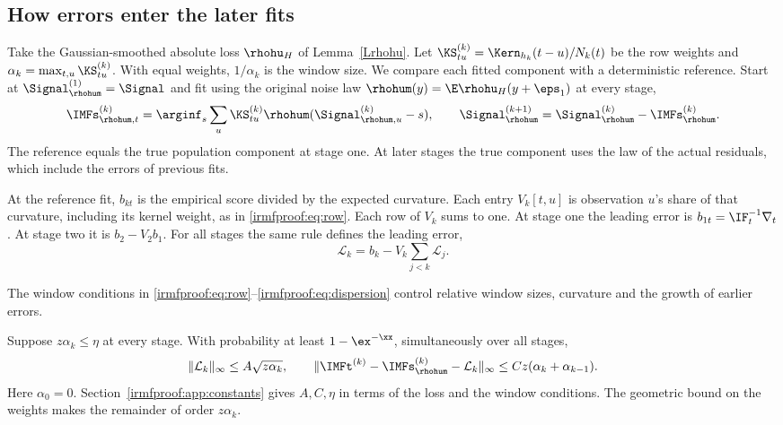 \subsection{How errors enter the later fits}\label{irmfproof:sec:recursive}

Take the Gaussian-smoothed absolute loss \(\rhohu_H\) of Lemma~\ref{Lrhohu}.
Let \(\KS_{tu}^{(k)}=\Kern_{h_k}(t-u)/N_k(t)\) be the row weights and
\(\alpha_k=\max_{t,u}\KS_{tu}^{(k)}\). With equal weights,
\(1/\alpha_k\) is the window size. We compare each fitted component with
a deterministic reference. Start at \(\Signal_{\rhohum}^{(1)}=\Signal\)
and fit using the original noise law \(\rhohum(y)=\E\rhohu_H(y+\eps_1)\)
at every stage,
\[
 \IMFs_{\rhohum,t}^{(k)}
 =\arginf_s\sum_u\KS_{tu}^{(k)}\rhohum(\Signal_{\rhohum,u}^{(k)}-s),
 \qquad \Signal_{\rhohum}^{(k+1)}=\Signal_{\rhohum}^{(k)}-\IMFs_{\rhohum}^{(k)} .
\]
The reference equals the true population component at stage one.
At later stages the true component uses the law of the actual residuals,
which include the errors of previous fits.

At the reference fit, \(b_{kt}\) is the empirical score divided by the
expected curvature. Each entry \(V_k[t,u]\) is observation \(u\)'s share of
that curvature, including its kernel weight, as in \eqref{irmfproof:eq:row}.
Each row of \(V_k\) sums to one. At stage one the leading error is
\(b_{1t}=\IF_t^{-1}\nabla_t\). At stage two it is \(b_2-V_2b_1\).
For all stages the same rule defines the leading error,
\begin{equation}\label{irmfproof:eq:lambda}
 \mathcal L_k=b_k-V_k\sum_{j<k}\mathcal L_j .
\end{equation}

The window conditions in \eqref{irmfproof:eq:row}--\eqref{irmfproof:eq:dispersion}
control relative window sizes, curvature and the growth of earlier errors.

\begin{theorem}\label{irmfproof:thm:main}
Suppose \(z\alpha_k\le\eta\) at every stage. With probability at least
\(1-\ex^{-\xx}\), simultaneously over all stages,
\begin{equation}\label{irmfproof:eq:expansion}
 \|\mathcal L_k\|_\infty\le A\sqrt{z\alpha_k},\qquad
 \|\IMFt^{(k)}-\IMFs_{\rhohum}^{(k)}-\mathcal L_k\|_\infty
   \le C z(\alpha_k+\alpha_{k-1}) .
\end{equation}
Here \(\alpha_0=0\). Section~\ref{irmfproof:app:constants} gives \(A,C,\eta\)
in terms of the loss and the window conditions. The geometric bound on the
weights makes the remainder of order \(z\alpha_k\).
\end{theorem}

